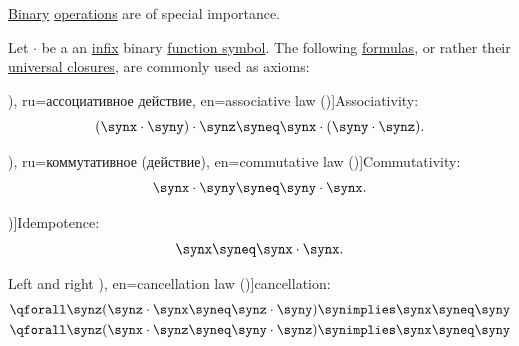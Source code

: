 \begin{definition}\label{def:binary_operation}
  \hyperref[def:operation_arity_terminology]{Binary} \hyperref[def:operation_on_set]{operations} are of special importance.

  Let \( {\cdot} \) be a an \hyperref[def:fol_signature/notation]{infix} binary \hyperref[def:fol_signature/function]{function symbol}. The following \hyperref[def:fol_formula]{formulas}, or rather their \hyperref[def:fol_quantifier_closure]{universal closures}, are commonly used as axioms:
  \begin{thmenum}
     \term[bg=асоциативен закон (\cite[11]{ГеновМиховскиМоллов1991Алгебра}), ru=ассоциативное действие, en=associative law (\cite[17]{Jacobson1985BasicAlgebraI})]{Associativity}:
    \begin{equation}\label{eq:def:binary_operation/associative}
      (\synx \cdot \syny) \cdot \synz \syneq \synx \cdot (\syny \cdot \synz).
    \end{equation}

     \term[bg=комутативен (закон) (\cite[11]{ГеновМиховскиМоллов1991Алгебра}), ru=коммутативное (действие), en=commutative law (\cite[17]{Jacobson1985BasicAlgebraI})]{Commutativity}:
    \begin{equation}\label{eq:def:binary_operation/commutative}
      \synx \cdot \syny \syneq \syny \cdot \synx.
    \end{equation}

     \term[ru=идемпотентная (операция), en=idempotent (operation) (\cite[\S A.2.1]{Mimram2020ProgramEqualsProof})]{Idempotence}:
    \begin{equation}\label{eq:def:binary_operation/idempotent}
      \synx \syneq \synx \cdot \synx.
    \end{equation}

     Left and right \term[ru=сокращение, bg=съкращение (\cite[77]{ГеновМиховскиМоллов1991Алгебра}), en=cancellation law (\cite[17]{Jacobson1985BasicAlgebraI})]{cancellation}:
    \begin{align}
      \qforall \synz (\synz \cdot \synx \syneq \synz \cdot \syny) \synimplies \synx \syneq \syny
      \label{eq:def:binary_operation/cancellative/left}
      \\
      \qforall \synz (\synx \cdot \synz \syneq \syny \cdot \synz) \synimplies \synx \syneq \syny
      \label{eq:def:binary_operation/cancellative/right}
    \end{align}
  \end{thmenum}
\end{definition}

